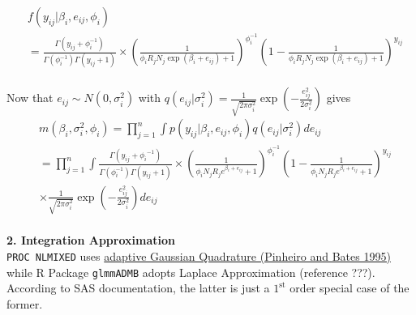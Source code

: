 \documentclass[paper=a4, fontsize=12.5pt]{scrartcl} %
\numberwithin{equation}{section} %
\numberwithin{figure}{section} %
\numberwithin{table}{section} %
\begin{document}
\begin{align*}
&f(y_{ij}| \beta_i, e_{ij}, \phi_i) \\
& = \frac{\Gamma(y_{ij}+ \phi_i^{-1})}{\Gamma(\phi_i^{-1})\Gamma(y_{ij} + 1)}\times \left(\frac{1}{\phi_iR_jN_j\exp(\beta_i  + e_{ij}) + 1}\right)^{\phi_i^{-1}}\left(1-\frac{1}{\phi_iR_jN_j\exp(\beta_i  + e_{ij}) + 1}\right)^{y_{ij}}\\
\end{align*}


  Now that $e_{ij}\sim N(0, \sigma_i^2)$ with $q(e_{ij}|\sigma_i^2)= \frac{1}{\sqrt{2\pi\sigma_i^2}}\exp\left(-\frac{e_{ij}^2}{2\sigma_i^2}\right)$ gives 
  \begin{align*}
    & m(\beta_i, \sigma_i^2, \phi_i)=\prod_{j=1}^n\int p(y_{ij}| \beta_i, e_{ij}, \phi_i)q(e_{ij}|\sigma_i^2)de_{ij} \\
    &=\prod_{j= 1}^n\int\frac{\Gamma(y_{ij}+ {\phi_i}^{-1})}{\Gamma(\phi_i^{-1})\Gamma(y_{ij} + 1)}\times \left(\frac{1}{\phi_i N_jR_je^{\beta_i  + e_{ij}} + 1}\right)^{\phi_i^{-1}}\left(1-\frac{1}{\phi_i N_jR_je^{\beta_i  + e_{ij}} + 1}\right)^{y_{ij}} \\
    &\times \frac{1}{\sqrt{2\pi\sigma_i^2}}\exp\left(-\frac{e_{ij}^2}{2\sigma_i^2}\right)de_{ij} \\
  \end{align*}

  \textbf{2. Integration Approximation}\\
   \verb"PROC NLMIXED" uses \href{http://citeseerx.ist.psu.edu/viewdoc/download?doi=10.1.1.55.99&rep=rep1&type=pdf}{adaptive Gaussian Quadrature (Pinheiro and Bates 1995)} while R Package \verb"glmmADMB" adopts Laplace Approximation (reference ???). According to SAS documentation, the latter is just a $1^{\text{st}}$ order special case of the former. \\   
   
\end{document}
